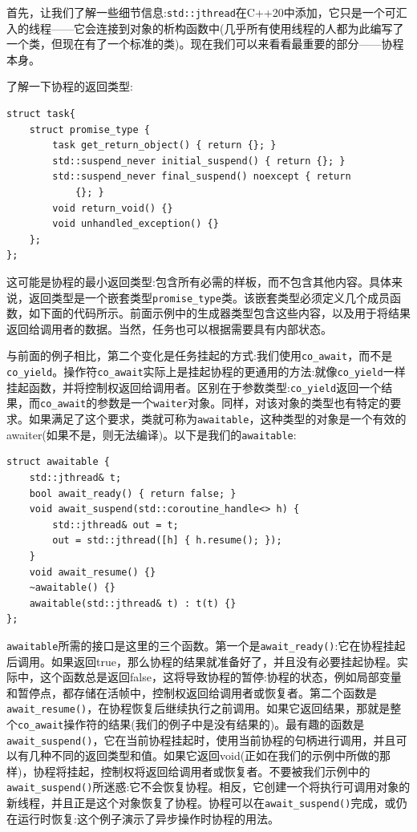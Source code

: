 首先，让我们了解一些细节信息:\texttt{std::jthread}在C++20中添加，它只是一个可汇入的线程——它会连接到对象的析构函数中(几乎所有使用线程的人都为此编写了一个类，但现在有了一个标准的类)。现在我们可以来看看最重要的部分——协程本身。 

了解一下协程的返回类型:

\begin{lstlisting}[style=styleCXX]
struct task{
	struct promise_type {
		task get_return_object() { return {}; }
		std::suspend_never initial_suspend() { return {}; }
		std::suspend_never final_suspend() noexcept { return 
			{}; }
		void return_void() {}
		void unhandled_exception() {}
	};
};
\end{lstlisting}

这可能是协程的最小返回类型:包含所有必需的样板，而不包含其他内容。具体来说，返回类型是一个嵌套类型\texttt{promise\_type}类。该嵌套类型必须定义几个成员函数，如下面的代码所示。前面示例中的生成器类型包含这些内容，以及用于将结果返回给调用者的数据。当然，任务也可以根据需要具有内部状态。

与前面的例子相比，第二个变化是任务挂起的方式:我们使用\texttt{co\_await}，而不是\texttt{co\_yield}。操作符\texttt{co\_await}实际上是挂起协程的更通用的方法:就像\texttt{co\_yield}一样挂起函数，并将控制权返回给调用者。区别在于参数类型:\texttt{co\_yield}返回一个结果，而\texttt{co\_await}的参数是一个\texttt{waiter}对象。同样，对该对象的类型也有特定的要求。如果满足了这个要求，类就可称为\texttt{awaitable}，这种类型的对象是一个有效的awaiter(如果不是，则无法编译)。以下是我们的\texttt{awaitable}:

\begin{lstlisting}[style=styleCXX]
struct awaitable {
	std::jthread& t;
	bool await_ready() { return false; }
	void await_suspend(std::coroutine_handle<> h) {
		std::jthread& out = t;
		out = std::jthread([h] { h.resume(); });
	}
	void await_resume() {}
	~awaitable() {}
	awaitable(std::jthread& t) : t(t) {}
};
\end{lstlisting}

\texttt{awaitable}所需的接口是这里的三个函数。第一个是\texttt{await\_ready()}:它在协程挂起后调用。如果返回true，那么协程的结果就准备好了，并且没有必要挂起协程。实际中，这个函数总是返回false，这将导致协程的暂停:协程的状态，例如局部变量和暂停点，都存储在活帧中，控制权返回给调用者或恢复者。第二个函数是\texttt{await\_resume()}，在协程恢复后继续执行之前调用。如果它返回结果，那就是整个\texttt{co\_await}操作符的结果(我们的例子中是没有结果的)。最有趣的函数是\texttt{await\_suspend()}，它在当前协程挂起时，使用当前协程的句柄进行调用，并且可以有几种不同的返回类型和值。如果它返回void(正如在我们的示例中所做的那样)，协程将挂起，控制权将返回给调用者或恢复者。不要被我们示例中的\texttt{await\_suspend()}所迷惑:它不会恢复协程。相反，它创建一个将执行可调用对象的新线程，并且正是这个对象恢复了协程。协程可以在\texttt{await\_suspend()}完成，或仍在运行时恢复:这个例子演示了异步操作时协程的用法。 

